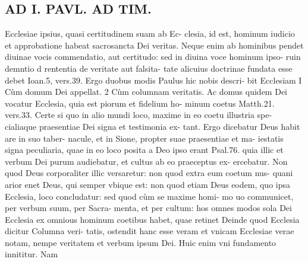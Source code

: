 \documentclass{article}
\begin{document}
\begin{pages}
\section*{AD I. PAVL. AD TIM. }
\marginpar{[ p.172 ]}\pstart Ecclesiae ipsius, quasi certitudinem suam ab Ec- clesia, id est, hominum iudicio et approbatione habeat sacrosancta Dei veritas. Neque enim ab hominibus pendet diuinae vocis commendatio, aut certitudo: sed in diuina voce hominum ipso- ruin demntio d rententia de veritate aut falsita- tate alicuius doctrinae fundata esse debet Ioan.5, vers.39.  \pend\pstart Ergo duobus modis Paulus hic nobis descri- bit Ecclesiam I Cùm domum Dei appellat. 2 Cùm columnam veritatis. Ac domus quidem Dei vocatur Ecclesia, quia est piorum et fidelium ho- minum coetus Matth.21. vers.33. Certe si quo in alio mundi loco, maxime in eo coetu illustria spe- cialiaque praesentiae Dei signa et testimonia ex- tant. Ergo dicebatur Deus habit are in suo taber- nacule, et in Sione, propter suae praesentiae et ma- iestatis signa peculiaria, quae in eo loco posita a Deo ipso erant Psal.76. quia illic et verbum Dei purum audiebatur, et cultus ab eo praeceptus ex- ercebatur. Non quod Deus corporaliter illic versaretur: non quod extra eum coetum nus- quani arior enet Deus, qui semper vbique est: non quod etiam Deus eodem, quo ipsa Ecclesia, loco concludatur: sed quod cùm se maxime homi- mo uo communicet, per verbum suum, per Sacra- menta, et per cultum: hos omnes modos sola Dei Ecclesia ex omnious hominum coetibus habet, quae retinet  \pend\pstart Deinde quod Ecclesia dicitur Columna veri- tatis, ostendit hanc esse veram et vnicam Ecclesiae verae notam, nempe veritatem et verbum ipsum Dei. Huic enim vni fundamento innititur. Nam  \pend

\end{pages}
\end{document}
